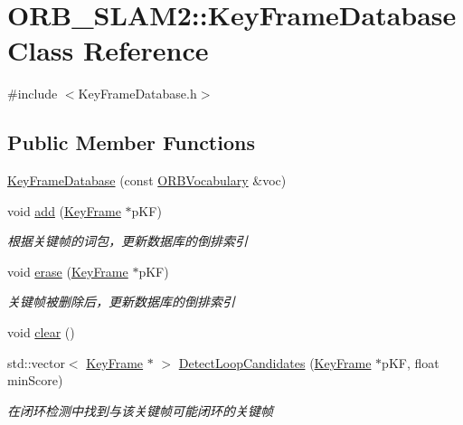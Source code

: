 \hypertarget{class_o_r_b___s_l_a_m2_1_1_key_frame_database}{}\section{O\+R\+B\+\_\+\+S\+L\+A\+M2\+:\+:Key\+Frame\+Database Class Reference}
\label{class_o_r_b___s_l_a_m2_1_1_key_frame_database}


{\ttfamily \#include $<$Key\+Frame\+Database.\+h$>$}

\subsection*{Public Member Functions}
\begin{DoxyCompactItemize}
\item 
\mbox{\hyperlink{class_o_r_b___s_l_a_m2_1_1_key_frame_database_a83495a11d1fb3cd98e82fa1e2efb6920}{Key\+Frame\+Database}} (const \mbox{\hyperlink{namespace_o_r_b___s_l_a_m2_a2fafba714858cab1bb18d438e2e83c5d}{O\+R\+B\+Vocabulary}} \&voc)
\item 
void \mbox{\hyperlink{class_o_r_b___s_l_a_m2_1_1_key_frame_database_a1b3a362116e3ecf2cd7e151be2ca3fcb}{add}} (\mbox{\hyperlink{class_o_r_b___s_l_a_m2_1_1_key_frame}{Key\+Frame}} $\ast$p\+KF)
\begin{DoxyCompactList}\small\item\em 根据关键帧的词包，更新数据库的倒排索引 \end{DoxyCompactList}\item 
void \mbox{\hyperlink{class_o_r_b___s_l_a_m2_1_1_key_frame_database_aa5b56ae1d1cb827fb4602abd61d77a06}{erase}} (\mbox{\hyperlink{class_o_r_b___s_l_a_m2_1_1_key_frame}{Key\+Frame}} $\ast$p\+KF)
\begin{DoxyCompactList}\small\item\em 关键帧被删除后，更新数据库的倒排索引 \end{DoxyCompactList}\item 
void \mbox{\hyperlink{class_o_r_b___s_l_a_m2_1_1_key_frame_database_a3eccf99ba2e387d0273f919fd0574ea2}{clear}} ()
\item 
std\+::vector$<$ \mbox{\hyperlink{class_o_r_b___s_l_a_m2_1_1_key_frame}{Key\+Frame}} $\ast$ $>$ \mbox{\hyperlink{class_o_r_b___s_l_a_m2_1_1_key_frame_database_a2d396aae02c4318ea8c7e7eff8059c69}{Detect\+Loop\+Candidates}} (\mbox{\hyperlink{class_o_r_b___s_l_a_m2_1_1_key_frame}{Key\+Frame}} $\ast$p\+KF, float min\+Score)
\begin{DoxyCompactList}\small\item\em 在闭环检测中找到与该关键帧可能闭环的关键帧 \end{DoxyCompactList}\item 

\end{DoxyCompactItemize}
